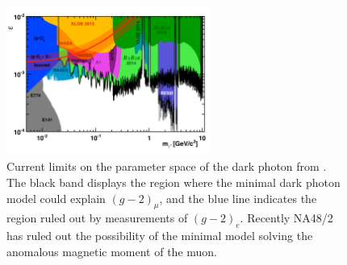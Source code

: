 \begin{figure}[h]
    \centering
    \includegraphics[width = 0.6\textwidth]{Figures/limits/darkphoton_limits}
    \caption{Current limits on the parameter space of the dark photon from \cite{Batley:2015lha}. The black band displays the region where the minimal dark photon model could explain $(g-2)_\mu$, and the blue line indicates the region ruled out by measurements of $(g-2)_e$. Recently NA48/2 has ruled out the possibility of the minimal model solving the anomalous magnetic moment of the muon.}
    \label{fig:darkphoton_limits}
\end{figure}

